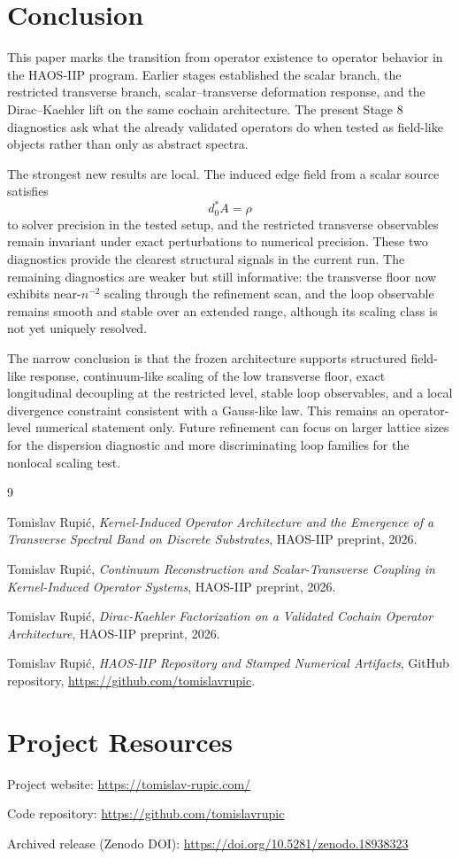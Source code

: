 \documentclass[11pt]{article}
\begin{document}
\section{Conclusion}
This paper marks the transition from operator existence to operator behavior in the HAOS-IIP program. Earlier stages established the scalar branch, the restricted transverse branch, scalar--transverse deformation response, and the Dirac--Kaehler lift on the same cochain architecture. The present Stage 8 diagnostics ask what the already validated operators do when tested as field-like objects rather than only as abstract spectra.

The strongest new results are local. The induced edge field from a scalar source satisfies
\begin{equation}
d_0^{*}A = \rho
\end{equation}
to solver precision in the tested setup, and the restricted transverse observables remain invariant under exact perturbations to numerical precision. These two diagnostics provide the clearest structural signals in the current run. The remaining diagnostics are weaker but still informative: the transverse floor now exhibits near-$n^{-2}$ scaling through the refinement scan, and the loop observable remains smooth and stable over an extended range, although its scaling class is not yet uniquely resolved.

The narrow conclusion is that the frozen architecture supports structured field-like response, continuum-like scaling of the low transverse floor, exact longitudinal decoupling at the restricted level, stable loop observables, and a local divergence constraint consistent with a Gauss-like law. This remains an operator-level numerical statement only. Future refinement can focus on larger lattice sizes for the dispersion diagnostic and more discriminating loop families for the nonlocal scaling test.

\begin{thebibliography}{9}

Tomislav Rupi\'c,
\newblock \emph{Kernel-Induced Operator Architecture and the Emergence of a Transverse Spectral Band on Discrete Substrates},
\newblock HAOS-IIP preprint, 2026.

Tomislav Rupi\'c,
\newblock \emph{Continuum Reconstruction and Scalar-Transverse Coupling in Kernel-Induced Operator Systems},
\newblock HAOS-IIP preprint, 2026.

Tomislav Rupi\'c,
\newblock \emph{Dirac-Kaehler Factorization on a Validated Cochain Operator Architecture},
\newblock HAOS-IIP preprint, 2026.

Tomislav Rupi\'c,
\newblock \emph{HAOS-IIP Repository and Stamped Numerical Artifacts},
\newblock GitHub repository, \url{https://github.com/tomislavrupic}.

\end{thebibliography}

\section*{Project Resources}
Project website: \url{https://tomislav-rupic.com/}

Code repository: \url{https://github.com/tomislavrupic}

Archived release (Zenodo DOI): \url{https://doi.org/10.5281/zenodo.18938323}
\end{document}
